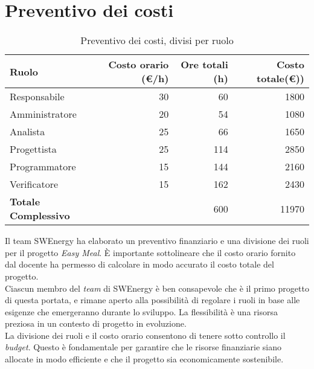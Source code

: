 \section{Preventivo dei costi}

\begin{table}[H]
	\renewcommand{\arraystretch}{1.5}
	\centering
	\begin{tabular}{l|r|r|r}
		\textbf{Ruolo} & \textbf{Costo orario (\euro/h)} & \textbf{Ore totali (h)} & 
		\textbf{Costo totale(\euro))} \\
		\hline
		Responsabile				&	 30 &  60 &	 1800			\\
		Amministratore				&	 20 &  54 &   1080  		\\
		Analista					&	 25 &  66 &  1650			\\
		Progettista					&	 25 &  114 &  2850			\\
		Programmatore				&	 15 & 144 &  2160			\\
		Verificatore				&	 15 & 162 &  2430			\\
		\hline
		\textbf{Totale Complessivo} &		& 600 &	11970			\\
	\end{tabular}
	\caption{Preventivo dei costi, divisi per ruolo}

\end{table}

Il team SWEnergy ha elaborato un preventivo finanziario e una divisione dei
ruoli per il progetto \textit{Easy Meal}. È importante 
sottolineare che il costo orario fornito dal docente ha permesso di calcolare 
in modo accurato il costo totale del progetto. \\

\noindent
Ciascun membro del \textit{team} di SWEnergy è ben consapevole che è il primo
progetto di questa portata, e 
rimane aperto alla possibilità di regolare i ruoli in base alle esigenze che 
emergeranno durante lo sviluppo. La flessibilità è una risorsa preziosa in un 
contesto di progetto in evoluzione. \\
La divisione dei ruoli e il costo orario consentono di tenere sotto controllo il
\textit{budget}. Questo è fondamentale per garantire che le risorse finanziarie siano 
allocate in modo efficiente e che il progetto sia economicamente sostenibile.
